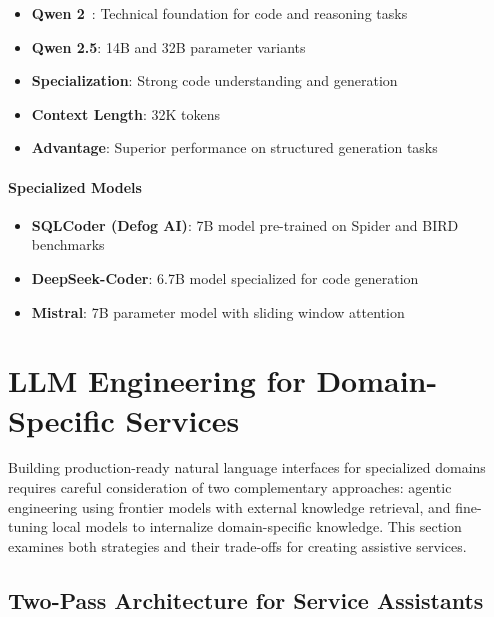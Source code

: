 \begin{itemize}[leftmargin=1.2em]
  \item \textbf{Qwen 2}~\cite{yang2024qwen2}: Technical foundation for code and reasoning tasks
  \item \textbf{Qwen 2.5}: 14B and 32B parameter variants
  \item \textbf{Specialization}: Strong code understanding and generation
  \item \textbf{Context Length}: 32K tokens
  \item \textbf{Advantage}: Superior performance on structured generation tasks
\end{itemize}

\paragraph{Specialized Models}

\begin{itemize}[leftmargin=1.2em]
  \item \textbf{SQLCoder (Defog AI)}: 7B model pre-trained on Spider and BIRD benchmarks
  \item \textbf{DeepSeek-Coder}: 6.7B model specialized for code generation
  \item \textbf{Mistral}: 7B parameter model with sliding window attention
\end{itemize}

\section{LLM Engineering for Domain-Specific Services}

Building production-ready natural language interfaces for specialized domains requires careful consideration of two complementary approaches: agentic engineering using frontier models with external knowledge retrieval, and fine-tuning local models to internalize domain-specific knowledge. This section examines both strategies and their trade-offs for creating assistive services.

\subsection{Two-Pass Architecture for Service Assistants}

